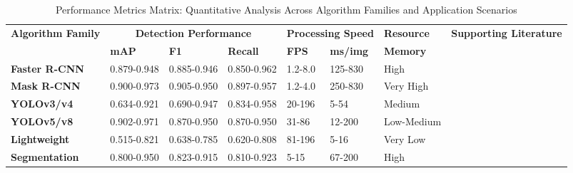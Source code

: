 \begin{table*}[htbp]
\centering
\footnotesize
\caption{Performance Metrics Matrix: Quantitative Analysis Across Algorithm Families and Application Scenarios}
\label{tab:performance_metrics_matrix}
\begin{tabular}{@{}p{}p{}p{}p{}p{}p{}p{}p{}@{}}
\toprule
\multirow{2}{*}{\textbf{Algorithm Family}} & \multicolumn{3}{c}{\textbf{Detection Performance}} & \multicolumn{2}{c}{\textbf{Processing Speed}} & \textbf{Resource} & \multirow{2}{*}{\textbf{Supporting Literature}} \\
\cmidrule(lr){2-4} \cmidrule(lr){5-6} \cmidrule(lr){7-7}
& \textbf{mAP} & \textbf{F1} & \textbf{Recall} & \textbf{FPS} & \textbf{ms/img} & \textbf{Memory} & \\
\midrule

\textbf{Faster R-CNN} & 
0.879-0.948 & 
0.885-0.946 & 
0.850-0.962 & 
1.2-8.0 & 
125-830 & 
High & 
\cite{sa2016deepfruits,wan2020faster,tu2020passion,fu2018kiwifruit} \\

\textbf{Mask R-CNN} & 
0.900-0.973 & 
0.905-0.950 & 
0.897-0.957 & 
1.2-4.0 & 
250-830 & 
Very High & 
\cite{yu2019fruit,jia2020detection,chu2021deep,ge2019fruit} \\

\textbf{YOLOv3/v4} & 
0.634-0.921 & 
0.690-0.947 & 
0.834-0.958 & 
20-196 & 
5-54 & 
Medium & 
\cite{liu2020yolo,kuznetsova2020using,li2021real,sozzi2022automatic} \\

\textbf{YOLOv5/v8} & 
0.902-0.971 & 
0.870-0.950 & 
0.870-0.950 & 
31-86 & 
12-200 & 
Low-Medium & 
\cite{yu2024object,ZHOU2024110,ZHANG2024108836,LU2024108721} \\

\textbf{Lightweight} & 
0.515-0.821 & 
0.638-0.785 & 
0.620-0.808 & 
81-196 & 
5-16 & 
Very Low & 
\cite{magalhaes2021evaluating,bresilla2019single,tang2023fruit} \\

\textbf{Segmentation} & 
0.800-0.950 & 
0.823-0.915 & 
0.810-0.923 & 
5-15 & 
67-200 & 
High & 
\cite{barth2018data,kang2019fruit,li2020detection,majeed2020deep} \\

\bottomrule
\end{tabular}
\end{table*}